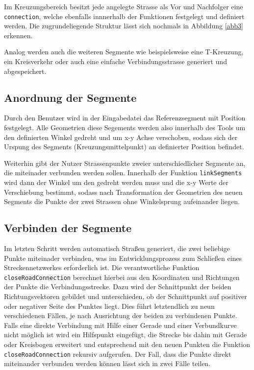 Im Kreuzungsbereich besitzt jede angelegte Strasse als Vor und Nachfolger eine \texttt{connection}, welche ebenfalls innnerhalb der Funktionen festgelegt und definiert werden. Die zugrundeliegende Struktur lässt sich nochmals in Abbildung \ref{abb3} erkennen.

Analog werden auch die weiteren Segmente wie beispielsweise eine T-Kreuzung, ein Kreisverkehr oder auch eine einfache Verbindungsstrasse generiert und abgespeichert.

\subsection{Anordnung der Segmente}

Durch den Benutzer wird in der Eingabedatei das Referenzsegment mit Position festgelegt. Alle Geometrien diese Segements werden also innerhalb des Tools um den definierten Winkel gedreht und um x-y Achse verschoben, sodass sich der Urspung des Segments (Kreuzungsmittelpunkt) an definierter Position befindet.

Weiterhin gibt der Nutzer Strassenpunkte zweier unterschiedlicher Segmente an, die miteinader verbunden werden sollen. Innerhalb der Funktion \texttt{linkSegments} wird dann der Winkel um den gedreht werden muss und die x-y Werte der Verschiebung bestimmt, sodass nach Transformation der Geometrien des neuen Segments die Punkte der zwei Strassen ohne Winkelsprung aufeinander liegen. 

\subsection{Verbinden der Segmente}

Im letzten Schritt werden automatisch Straßen generiert, die zwei beliebige Punkte miteinader verbinden, was im Entwicklungsprozess zum Schließen eines Streckennetzwerkes erforderlich ist. Die verantwortliche Funktion \texttt{closeRoadConnection} berechnet hierbei aus den Koordinaten und Richtungen der Punkte die Verbindungsstrecke. Dazu wird der Schnittpunkt der beiden Richtungsvektoren gebildet und unterschieden, ob der Schnittpunkt auf positiver oder negativer Seite des Punktes liegt. Dies führt letztendlich zu neun verschiedenen Fällen, je nach Ausrichtung der beiden zu verbindenen Punkte. Falls eine direkte Verbindung mit Hilfe einer Gerade und einer Verbundkurve nicht möglich ist wird ein Hilfspunkt eingefügt, die Strecke bis dahin mit Gerade oder Kreisbogen erweitert und entsprechend mit den neuen Punkten die Funktion \texttt{closeRoadConnection} rekursiv aufgerufen. Der Fall, dass die Punkte direkt miteinander verbunden werden können lässt sich in zwei Fälle teilen.

